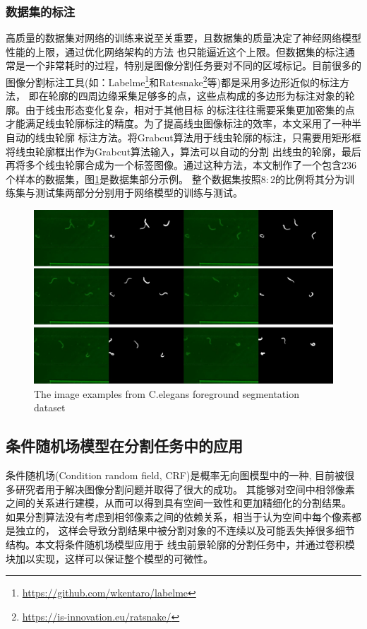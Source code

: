 \subsubsection{数据集的标注}
	高质量的数据集对网络的训练来说至关重要，且数据集的质量决定了神经网络模型性能的上限，通过优化网络架构的方法
	也只能逼近这个上限。但数据集的标注通常是一个非常耗时的过程，特别是图像分割任务要对不同的区域标记。目前很多的
	图像分割标注工具(如：Labelme\footnote{\url{https://github.com/wkentaro/labelme}}和Ratesnake\footnote{\url{https://is-innovation.eu/ratsnake/}}等)都是采用多边形近似的标注方法，
	即在轮廓的四周边缘采集足够多的点，这些点构成的多边形为标注对象的轮廓。由于线虫形态变化复杂，相对于其他目标
	的标注往往需要采集更加密集的点才能满足线虫轮廓标注的精度。为了提高线虫图像标注的效率，本文采用了一种半自动的线虫轮廓
	标注方法。将Grabcut算法用于线虫轮廓的标注，只需要用矩形框将线虫轮廓框出作为Grabcut算法输入，算法可以自动的分割
	出线虫的轮廓，最后再将多个线虫轮廓合成为一个标签图像。通过这种方法，本文制作了一个包含236个样本的数据集，图\ref{fig:dataset}是数据集部分示例。
	整个数据集按照$8:2$的比例将其分为训练集与测试集两部分分别用于网络模型的训练与测试。
	\begin{figure}[h]
	  \centering
	  \includegraphics[width=14cm]{figure/chap3/dataset.jpg}
		{The image examples from C.elegans foreground segmentation dataset}
	  \label{fig:dataset}
	\end{figure}
\subsection{条件随机场模型在分割任务中的应用}
	条件随机场(Condition random field, CRF)是概率无向图模型中的一种\cite{李航2012统计学习方法},
	目前被很多研究者用于解决图像分割问题并取得了很大的成功\cite{zheng2015conditional,wang2017adaptive,chen2018deeplab}。
	其能够对空间中相邻像素之间的关系进行建模，从而可以得到具有空间一致性和更加精细化的分割结果。
	如果分割算法没有考虑到相邻像素之间的依赖关系，相当于认为空间中每个像素都是独立的，
	这样会导致分割结果中被分割对象的不连续以及可能丢失掉很多细节结构。本文将条件随机场模型应用于
	线虫前景轮廓的分割任务中，并通过卷积模块加以实现，这样可以保证整个模型的可微性。
		
